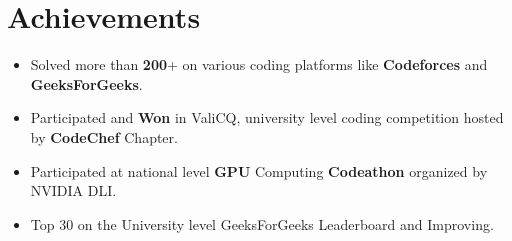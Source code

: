 \documentclass[letterpaper,11pt]{article}
\makeatletter
\newcommand{\resumeItem}[1]{
  \item\small{
    {#1 \vspace{-2pt}}
  }
}
\newcommand{\resumeSubheading}[4]{
  \vspace{-2pt}\item
    \begin{tabular*}{1.0\textwidth}[t]{l@{\extracolsep{\fill}}r}
      \textbf{#1} & \textbf{\small #2} \\
      \textit{\small#3} & \textit{\small #4} \\
    \end{tabular*}\vspace{-7pt}
}
\newcommand{\resumeSubHeadingListStart}{\begin{itemize}[leftmargin=0.0in, label={}]}
\newcommand{\resumeSubHeadingListEnd}{\end{itemize}}
\newcommand{\resumeItemListStart}{\begin{itemize}}
\newcommand{\resumeItemListEnd}{\end{itemize}\vspace{-5pt}}
\makeatother
\begin{document}
\section{Achievements}
    \resumeSubHeadingListStart
        \resumeItemListStart
            \resumeItem{Solved more than \textbf{200}+ on various coding platforms 
             like \textbf{Codeforces} and \textbf{GeeksForGeeks}.}
            \resumeItem{Participated and \textbf{Won} in ValiCQ, university level coding competition hosted by \textbf{CodeChef} Chapter.}
            \resumeItem{Participated at national level \textbf{GPU} Computing \textbf{Codeathon} organized by NVIDIA DLI.}
            \resumeItem{Top 30 on the University level GeeksForGeeks Leaderboard and Improving.}
        \resumeItemListEnd
     \resumeSubHeadingListEnd
        
    
        
\end{document}
